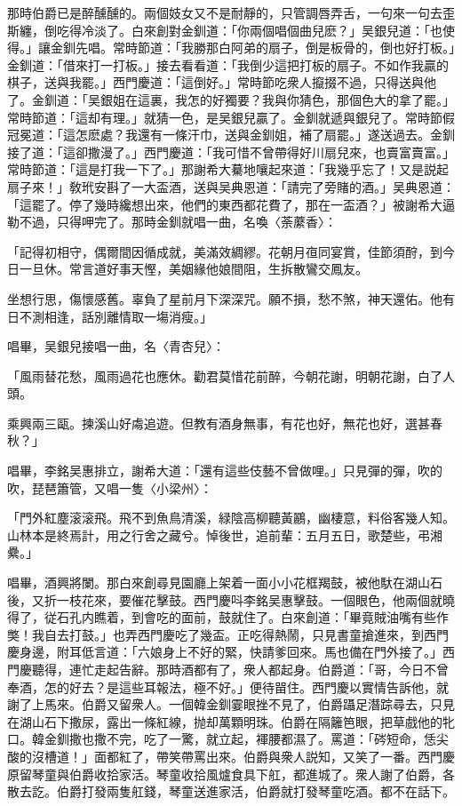 那時伯爵已是醉醺醺的。兩個妓女又不是耐靜的，只管調唇弄舌，一句來一句去歪斯纏，倒吃得冷淡了。白來創對金釧道：「你兩個唱個曲兒麽？」吴銀兒道：「也使得。」讓金釧先唱。常時節道：「我勝那白阿弟的扇子，倒是板骨的，倒也好打板。」金釧道：「借來打一打板。」接去看看道：「我倒少這把打板的扇子。不如作我贏的棋子，送與我罷。」西門慶道：「這倒好。」常時節吃衆人攛掇不過，只得送與他了。金釧道：「吴銀姐在這裏，我怎的好獨要？我與你猜色，那個色大的拿了罷。」常時節道：「這却有理。」就猜一色，是吴銀兒贏了。金釧就遞與銀兒了。常時節假冠冕道：「這怎麽處？我還有一條汗巾，送與金釧姐，補了扇罷。」遂送過去。金釧接了道：「這卻撒漫了。」西門慶道：「我可惜不曾帶得好川扇兒來，也賣富賣富。」常時節道：「這是打我一下了。」那謝希大驀地嚷起來道：「我幾乎忘了！又是説起扇子來！」敎玳安斟了一大盃酒，送與吴典恩道：「請完了旁賭的酒。」吴典恩道：「這罷了。停了幾時纔想出來，他們的東西都花費了，那在一盃酒？」被謝希大逼勒不過，只得呷完了。那時金釧就唱一曲，名喚〈荼䕷香〉：

「記得初相守，偶爾間因循成就，美滿效綢繆。花朝月亱同宴賞，佳節須酧，到今日一旦休。常言道好事天慳，美姻緣他娘間阻，生拆散鸞交鳳友。

坐想行思，傷懷感舊。辜負了星前月下深深咒。願不損，愁不煞，神天還佑。他有日不測相逢，話別離情取一塲消瘦。」

唱畢，吴銀兒接唱一曲，名〈青杏兒〉：

「風雨替花愁，風雨過花也應休。勸君莫惜花前醉，今朝花謝，明朝花謝，白了人頭。

乘興兩三甌。揀溪山好䖏追遊。但教有酒身無事，有花也好，無花也好，選甚春秋？」

唱畢，李銘吴惠排立，謝希大道：「還有這些伎藝不曾做哩。」只見彈的彈，吹的吹，琵琶簫管，又唱一隻〈小梁州〉：

「門外紅塵滚滚飛。飛不到魚鳥清溪，緑陰高柳聽黃鸝，幽棲意，料俗客幾人知。山林本是終焉計，用之行舍之藏兮。悼後世，追前輩：五月五日，歌楚些，弔湘纍。」

唱畢，酒興將闌。那白來創尋見園廳上架着一面小小花框羯鼓，被他馱在湖山石後，又折一枝花來，要催花擊鼓。西門慶呌李銘吴惠擊鼓。一個眼色，他兩個就曉得了，従石孔内瞧着，到會吃的面前，鼓就住了。白來創道：「畢竟賊油嘴有些作獘！我自去打鼓。」也弄西門慶吃了幾盃。正吃得熱鬧，只見書童搶進來，到西門慶身邊，附耳低言道：「六娘身上不好的緊，快請爹回來。馬也備在門外接了。」西門慶聽得，連忙走起告辭。那時酒都有了，衆人都起身。伯爵道：「哥，今日不曾奉酒，怎的好去？是這些耳報法，極不好。」便待㽞住。西門慶以實情告訴他，就謝了上馬來。伯爵又留衆人。一個韓金釧霎眼挫不見了，伯爵躡足潛踪尋去，只見在湖山石下撒尿，露出一條紅線，抛却萬顆明珠。伯爵在隔籬笆眼，把草戲他的牝口。韓金釧撒也撒不完，吃了一驚，就立起，褌腰都濕了。罵道：「硶短命，恁尖酸的沒槽道！」面都紅了，帶笑帶罵出來。伯爵與衆人説知，又笑了一番。西門慶原留琴童與伯爵收拾家活。琴童收拾風爐食具下舡，都進城了。衆人謝了伯爵，各散去訖。伯爵打發兩隻舡錢，琴童送進家活，伯爵就打發琴童吃酒。都不在話下。

